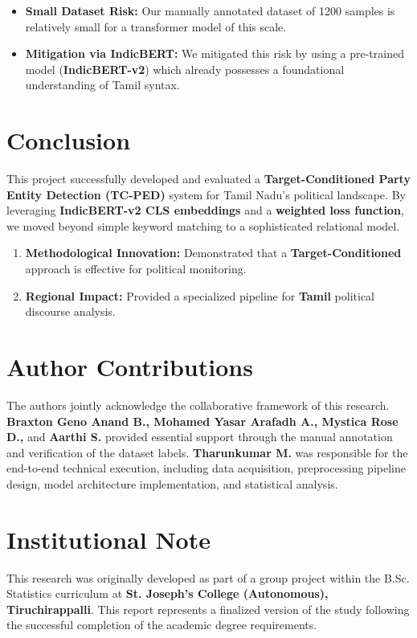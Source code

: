 \documentclass[12pt,a4paper]{article}
\begin{document}
\begin{itemize}
    \item \textbf{Small Dataset Risk:} Our manually annotated dataset of 1200 samples is relatively small for a transformer model of this scale.
    \item \textbf{Mitigation via IndicBERT:} We mitigated this risk by using a pre-trained model (\textbf{IndicBERT-v2}) which already possesses a foundational understanding of Tamil syntax.
\end{itemize}

\section{Conclusion}
This project successfully developed and evaluated a \textbf{Target-Conditioned Party Entity Detection (TC-PED)} system for Tamil Nadu's political landscape. By leveraging \textbf{IndicBERT-v2 CLS embeddings} and a \textbf{weighted loss function}, we moved beyond simple keyword matching to a sophisticated relational model.

\begin{enumerate}
    \item \textbf{Methodological Innovation:} Demonstrated that a \textbf{Target-Conditioned} approach is effective for political monitoring.
    \item \textbf{Regional Impact:} Provided a specialized pipeline for \textbf{Tamil} political discourse analysis.
\end{enumerate}

\section*{Author Contributions}
The authors jointly acknowledge the collaborative framework of this research. \textbf{Braxton Geno Anand B., Mohamed Yasar Arafadh A., Mystica Rose D.,} and \textbf{Aarthi S.} provided essential support through the manual annotation and verification of the dataset labels. \textbf{Tharunkumar M.} was responsible for the end-to-end technical execution, including data acquisition, preprocessing pipeline design, model architecture implementation, and statistical analysis.

\section*{Institutional Note}
This research was originally developed as part of a group project within the B.Sc. Statistics curriculum at \textbf{St. Joseph's College (Autonomous), Tiruchirappalli}. This report represents a finalized version of the study following the successful completion of the academic degree requirements.
\end{document}
